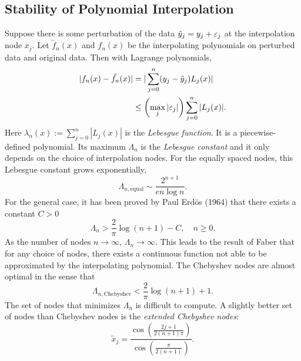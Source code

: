 \subsection{Stability of Polynomial Interpolation}
\label{SSec: 2-Sta-Pol-Int}
Suppose there is some perturbation of the data $\tilde{y}_j = y_j + \varepsilon_j$ at the interpolation node $x_j$. Let $\tilde{f}_n(x)$ and $f_n(x)$ be the interpolating polynomials on perturbed data and original data. Then with Lagrange polynomials, 
\begin{equation}
    \begin{aligned}
        |f_n(x) - \tilde{f_n}(x)| &= |\sum_{j=0}^n (y_j - \tilde{y}_j) L_j(x)| \\
        &\le \left(\max_{j} |\varepsilon_j|\right) \sum_{j=0}^n |L_j(x)|.
    \end{aligned}
\end{equation}
Here $\lambda_n(x) := \sum_{j=0}^n |L_j(x)|$ is the \emph{Lebesgue function}. It is a piecewise-defined polynomial. Its maximum $\Lambda_n$ is the \emph{Lebesgue constant} and it only depends on the choice of interpolation nodes. 
For the equally spaced nodes, this Lebesgue constant grows exponentially,
\begin{equation}
    \Lambda_{n, \textrm{equal}} \sim \frac{2^{n+1}}{en \log n}.
\end{equation}
For the general case, it has been proved by Paul Erd\"os (1964) that there exists a constant $C > 0$
\begin{equation}
    \Lambda_n > \frac{2}{\pi}\log(n+1) - C,\quad  n\ge 0.
\end{equation}
As the number of nodes $n\to \infty$, $\Lambda_n \to \infty$. This leads to the result of Faber that for any choice of nodes, there exists a continuous function not able to be approximated by the interpolating polynomial. The Chebyshev nodes are almost optimal in the sense that 
\begin{equation}
    \Lambda_{n, \textrm{Chebyshev}} < \frac{2}{\pi}\log(n+1) + 1.
\end{equation}
The set of nodes that minimizes $\Lambda_n$ is difficult to compute. A slightly better set of nodes than Chebyshev nodes is the \emph{extended Chebyshev nodes}:
\begin{equation}
    \tilde{x}_j = \frac{\cos\left(\frac{2j+1}{2(n+1)\pi}\right)}{\cos\left(\frac{\pi}{2(n+1)}\right)}.
\end{equation}

